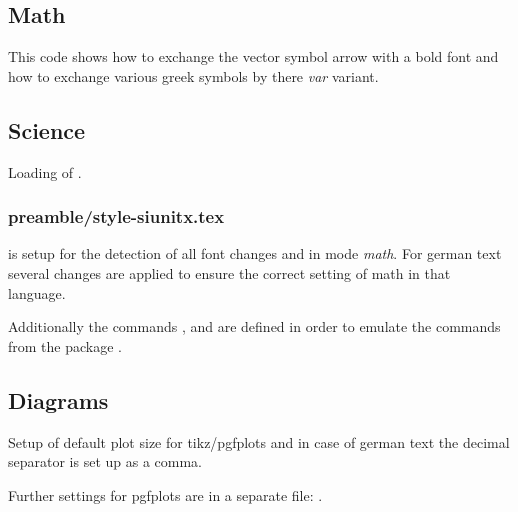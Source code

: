 
\subsection{Math}

This code shows how to exchange the vector symbol arrow with a bold font and how to exchange various greek symbols by there \emph{var} variant.


\subsection{Science}

Loading of .


\subsubsection{preamble/style-siunitx.tex}

 is setup for the detection of all font changes and in mode \emph{math}. For german text several changes are applied to ensure the correct setting of math in that language.

Additionally the commands ,  and  are defined in order to emulate the commands from the package .


\subsection{Diagrams}

Setup of default plot size for tikz/pgfplots and in case of german text the decimal separator is set up as a comma.

Further settings for pgfplots are in a separate file: 
.

